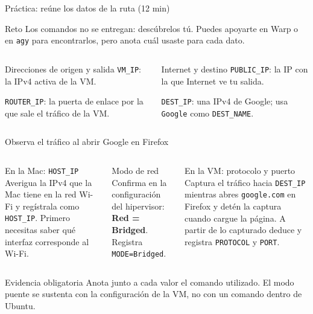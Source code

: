 \documentclass[aspectratio=169,10pt,c]{beamer}
\begin{document}
\begin{frame}{Práctica: reúne los datos de la ruta \textnormal{\small(12 min)}}
\begin{block}{Reto}
\small Los comandos no se entregan: descúbrelos tú. Puedes apoyarte en Warp o en \texttt{agy} para encontrarlos, pero anota cuál usaste para cada dato.
\end{block}
\begin{columns}[T,onlytextwidth]
\begin{exampleblock}{Direcciones de origen y salida}
\small
\texttt{VM\_IP}: la IPv4 activa de la VM.\par\medskip
\texttt{ROUTER\_IP}: la puerta de enlace por la que sale el tráfico de la VM.
\end{exampleblock}
\begin{exampleblock}{Internet y destino}
\small
\texttt{PUBLIC\_IP}: la IP con la que Internet ve tu salida.\par\medskip
\texttt{DEST\_IP}: una IPv4 de Google; usa \texttt{Google} como \texttt{DEST\_NAME}.
\end{exampleblock}
\end{columns}
\end{frame}

\begin{frame}[t]{Observa el tráfico al abrir Google en Firefox}
\begin{columns}[T,onlytextwidth]
\begin{exampleblock}{En la Mac: \texttt{HOST\_IP}}
\small Averigua la IPv4 que la Mac tiene en la red Wi-Fi y regístrala como \texttt{HOST\_IP}. Primero necesitas saber qué interfaz corresponde al Wi-Fi.
\end{exampleblock}
\begin{block}{Modo de red}
\small Confirma en la configuración del hipervisor: \textbf{Red = Bridged}. Registra \texttt{MODE=Bridged}.
\end{block}
\begin{exampleblock}{En la VM: protocolo y puerto}
\small Captura el tráfico hacia \texttt{DEST\_IP} mientras abres \texttt{google.com} en Firefox y detén la captura cuando cargue la página. A partir de lo capturado deduce y registra \texttt{PROTOCOL} y \texttt{PORT}.
\end{exampleblock}
\end{columns}
\begin{alertblock}{Evidencia obligatoria}
\scriptsize Anota junto a cada valor el comando utilizado. El modo puente se sustenta con la configuración de la VM, no con un comando dentro de Ubuntu.
\end{alertblock}
\end{frame}
\end{document}
